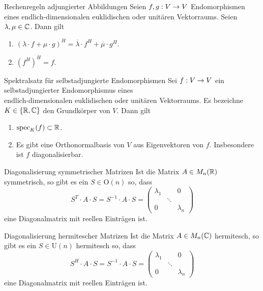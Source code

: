 \documentclass[main.tex]{subfiles}
\begin{document}
\begin{karte}{Rechenregeln adjungierter Abbildungen}
    Seien \(f,g : V \rightarrow V\) Endomorphismen eines 
    endlich-dimensionalen euklidischen oder unitären 
    Vektorraums. Seien \( \lambda, \mu\in \mathbb{C} \). Dann 
    gilt 
    \begin{enumerate}
        \item \( (\lambda \cdot f + \mu \cdot g)^H 
        = \overline{\lambda} \cdot f^H + \overline{\mu} \cdot g^H \).
        \item \( (f^H)^H =f \).
    \end{enumerate}
\end{karte}

\begin{karte}{Spektralsatz für selbstadjungierte Endomorphismen}
    Sei \( f : V \rightarrow V \) ein selbstadjungierter Endomorphismus 
    eines \\
    endlich-dimensionalen euklidischen oder unitären 
    Vektorraums. Es bezeichne \( K\in \{\mathbb{R}, \mathbb{C}\} \) 
    den Grundkörper von \(V\). Dann gilt 
    \begin{enumerate}
        \item \( \operatorname{spec}_K(f) \subset \mathbb{R} \).
        \item Es gibt eine Orthonormalbasis von \(V\) 
        aus Eigenvektoren von \(f\). Insbesondere ist 
        \(f\) diagonalisierbar.
    \end{enumerate}
\end{karte}

\begin{karte}{Diagonalisierung symmetrischer Matrizen}
    Ist die Matrix \( A\in M_n(\mathbb{R}) \) symmetrisch, 
    so gibt es ein \( S\in \mathrm{O}(n) \) so, dass 
    \[ S^T \cdot A \cdot S = S^{-1} \cdot A\cdot S 
    = \begin{pmatrix}
        \lambda_1 && 0 \\
        & \ddots & \\
        0 && \lambda_n
    \end{pmatrix} \]
    eine Diagonalmatrix mit reellen Einträgen ist.
\end{karte}

\begin{karte}{Diagonalisierung hermitescher Matrizen}
    Ist die Matrix \( A\in M_n(\mathbb{C}) \) hermitesch, so gibt es 
    ein \( S\in \mathrm{U}(n) \) hermitesch so, dass 
    \[ S^H \cdot A \cdot S = S^{-1} \cdot A \cdot S 
    = \begin{pmatrix}
        \lambda_1 && 0 \\
        & \ddots & \\
        0 && \lambda_n
    \end{pmatrix} \]
    eine Diagonalmatrix mit reellen Einträgen ist.
\end{karte}
\end{document}
